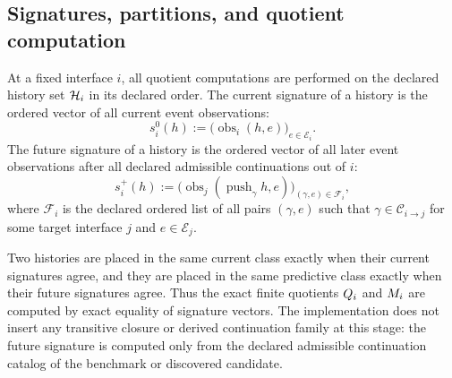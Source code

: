 \documentclass[11pt]{article}
\theoremstyle{definition}
\begin{document}
\subsection{Signatures, partitions, and quotient computation}\label{subsec:eff-signatures}
At a fixed interface $i$, all quotient computations are performed on the declared history set $\mathcal{H}_i$ in its declared order. The current signature of a history is the ordered vector of all current event observations:
\begin{equation}
s_i^{0}(h)
:=
\bigl(\operatorname{obs}_i(h,e)\bigr)_{e\in\mathcal{E}_i}.
\label{eq:current-signature}
\end{equation}
The future signature of a history is the ordered vector of all later event observations after all declared admissible continuations out of $i$:
\begin{equation}
s_i^{+}(h)
:=
\bigl(
\operatorname{obs}_j(\operatorname{push}_{\gamma} h,e)
\bigr)_{(\gamma,e)\in\mathcal{F}_i},
\label{eq:future-signature}
\end{equation}
where $\mathcal{F}_i$ is the declared ordered list of all pairs $(\gamma,e)$ such that $\gamma\in\mathcal{C}_{i\to j}$ for some target interface $j$ and $e\in\mathcal{E}_j$.

Two histories are placed in the same current class exactly when their current signatures agree, and they are placed in the same predictive class exactly when their future signatures agree. Thus the exact finite quotients $Q_i$ and $M_i$ are computed by exact equality of signature vectors. The implementation does not insert any transitive closure or derived continuation family at this stage: the future signature is computed only from the declared admissible continuation catalog of the benchmark or discovered candidate.
\end{document}
